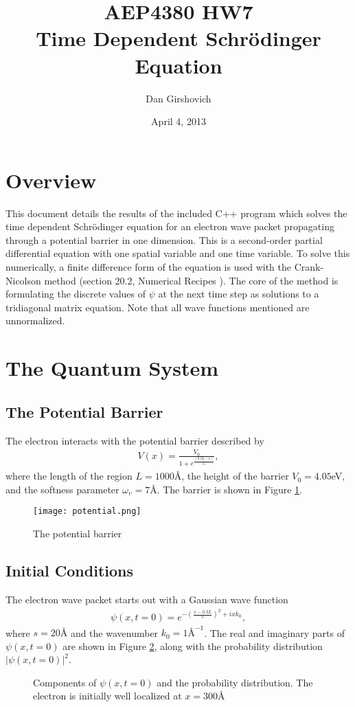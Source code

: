 \documentclass[12pt]{article}
\title{AEP4380 HW7 \\ Time Dependent Schr\"{o}dinger Equation}
\author{Dan Girshovich}
\date{April 4, 2013}
\begin{document}
\maketitle
\section{Overview}
This document details the results of the included C++ program which solves the time dependent Schr\"{o}dinger equation for an electron wave packet propagating through a potential barrier in one dimension. This is a second-order partial differential equation with one spatial variable and one time variable. To solve this numerically, a finite difference form of the equation is used with the Crank-Nicolson method (section 20.2, Numerical Recipes \cite{numericalrecipes}). The core of the method is formulating the discrete values of $\psi$ at the next time step as solutions to a tridiagonal matrix equation. Note that all wave functions mentioned are unnormalized.
\section{The Quantum System}
\subsection{The Potential Barrier}
The electron interacts with the potential barrier described by
\begin{align*}
V(x) = \frac{
    V_0
    }
    {
    1 + e^{
            \frac{
                \left(
                    0.5L - x
                \right)
                }
                {
                \omega_v
                }
        }
    },
\end{align*}
where the length of the region $L = 1000$\AA, the height of the barrier $V_0 = 4.05$eV, and the softness parameter $\omega_v = 7$\AA. The barrier is shown in Figure \ref{f1}.
\begin{figure}
  \centering
  \texttt{[image: potential.png]}
  \caption{The potential barrier}
  \label{f1}
\end{figure}
\subsection{Initial Conditions}
The electron wave packet starts out with a Gaussian wave function
\begin{align*}
\psi(x, t = 0) = e^{-\left(\frac{x - 0.3L}{s}\right)^2 + i x k_0},
\end{align*}
where $s = 20\text{\AA}$ and the wavenumber $k_0 = 1\text{\AA}^{-1}$. The real and imaginary parts of $\psi(x, t=0)$ are shown in Figure \ref{f2}, along with the probability distribution $|\psi(x, t=0)|^2$.
\begin{figure}
 \qquad
{} \qquad
{} \qquad
\caption{Components of $\psi(x, t=0)$ and the probability distribution. The electron is initially well localized at $x = 300\text{\AA}$}
  \label{f2}
\end{figure}
\end{document}
